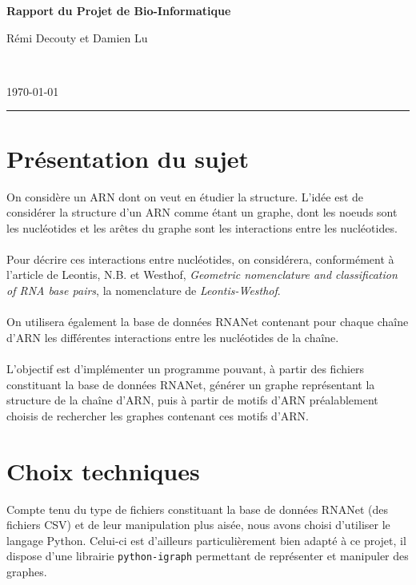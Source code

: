 \documentclass[11pt,a4paper]{article}
\begin{document}
\begin{huge}
    \begin{center} 
        \textbf{Rapport du Projet de Bio-Informatique} \\
        \begin{Large} Rémi Decouty et Damien Lu \end{Large} \\
        \begin{Large} \today \end{Large}
    \end{center} 
\end{huge} 


\hrule 
{}
\section{Présentation du sujet}
On considère un ARN dont on veut en étudier la structure. L'idée est de considérer la structure d'un ARN comme étant un graphe, dont les noeuds sont les nucléotides et les arêtes du graphe sont les interactions entre les nucléotides. 
\\\\
Pour décrire ces interactions entre nucléotides, on considérera, conformément à l'article de Leontis, N.B. et Westhof, \textit{Geometric nomenclature and classification of RNA base pairs}, la nomenclature de \textit{Leontis-Westhof}.
\\\\
On utilisera également la base de données RNANet contenant pour chaque chaîne d'ARN les différentes interactions entre les nucléotides de la chaîne. 
\\\\
L'objectif est d'implémenter un programme pouvant, à partir des fichiers constituant la base de données RNANet, générer un graphe représentant la structure de la chaîne d'ARN, puis à partir de motifs d'ARN préalablement choisis de rechercher les graphes contenant ces motifs d'ARN.
\section{Choix techniques}
Compte tenu du type de fichiers constituant la base de données RNANet (des fichiers CSV) et de leur manipulation plus aisée, nous avons choisi d'utiliser le langage Python. Celui-ci est d'ailleurs particulièrement bien adapté à ce projet, il dispose d'une librairie \texttt{python-igraph} permettant de représenter et manipuler des graphes.
\end{document}
